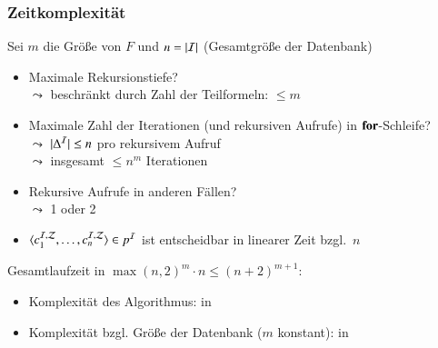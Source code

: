 \documentclass[aspectratio=1610,onlymath]{beamer}
\begin{document}
\begin{frame}\frametitle{Zeitkomplexität}

Sei $m$ die Größe von $F$ und $n=|\mathcal{I}|$ (Gesamtgröße der Datenbank)
\bigskip

\begin{itemize}
\item Maximale Rekursionstiefe?\\\pause
$\leadsto$ beschränkt durch Zahl der Teilformeln: $\leq m$
%
\item Maximale Zahl der Iterationen (und rekursiven Aufrufe) in $\textbf{for}$-Schleife?\\\pause
$\leadsto$ $|\Delta^{\mathcal{I}}|\leq n$ pro rekursivem Aufruf\\
$\leadsto$ insgesamt $\leq n^m$ Iterationen\pause
%
\item Rekursive Aufrufe in anderen Fällen?\\
$\leadsto$ 1 oder 2 \pause
%
\item $\langle{c_1^{\mathcal{I},\mathcal{Z}},\ldots,c_n^{\mathcal{I},\mathcal{Z}}}\rangle\in p^{\mathcal{I}}$ ist entscheidbar in linearer Zeit bzgl.\ $n$
\end{itemize}
\bigskip\pause

Gesamtlaufzeit in $\max(n,2)^m\cdot n \leq (n+2)^{m+1}$:
\begin{itemize}
\item Komplexität des Algorithmus: \alert{in \ExpTime}
\item Komplexität bzgl. Größe der Datenbank ($m$ konstant): \alert{in \PTime}
\end{itemize}

\end{frame}
\end{document}

